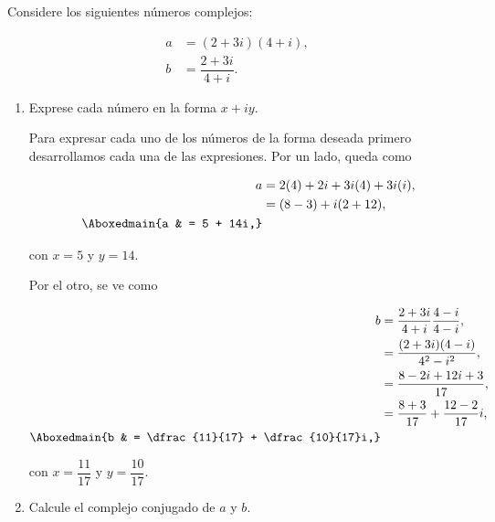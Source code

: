 \documentclass[./../main.tex]{subfiles}
\begin{document}
\begin{problema}
	Considere los siguientes números complejos:

	\begin{align}
		a & = (2 + 3i)(4 + i),\label{eq:a-complex}       \\
		b & = \dfrac{2 + 3i}{4 + i}.\label{eq:b-complex}
	\end{align}

	\begin{enumerate}
		\item Exprese cada número en la forma \(x + iy\).

		      \startsolution

		      Para expresar cada uno de los números de la forma deseada primero desarrollamos cada una de las expresiones. Por un lado,  queda como

		      \begin{align}
			      a             & = 2(4) + 2i + 3i(4) + 3i(i),\nonumber  \\
			                    & = (8 - 3) + i(2 + 12),\nonumber        \\
			      \Aboxedmain{a & = 5 + 14i,}\label{eq:a-complex-result}
		      \end{align}

		      con \(x = 5\) y \(y = 14\).

		      \pagebreak
		      Por el otro,  se ve como

		      \begin{align}
			      b             & = \dfrac{2 + 3i}{4 + i}\dfrac{4 - i}{4 - i},\nonumber           \\
			                    & = \dfrac{(2 + 3i)(4 - i)}{4^{2} - i^{2}},\nonumber              \\
			                    & = \dfrac{8 - 2i + 12i + 3}{17},\nonumber                        \\
			                    & = \dfrac{8 + 3}{17} + \dfrac{12 - 2}{17}i,\nonumber             \\
			      \Aboxedmain{b & = \dfrac{11}{17} + \dfrac{10}{17}i,}\label{eq:b-complex-result}
		      \end{align}

		      con \(x = \dfrac{11}{17}\) y \(y = \dfrac{10}{17}\).

		\item Calcule el complejo conjugado de \(a\) y \(b\).

		      \startsolution


\end{enumerate}
\end{problema}
\end{document}
